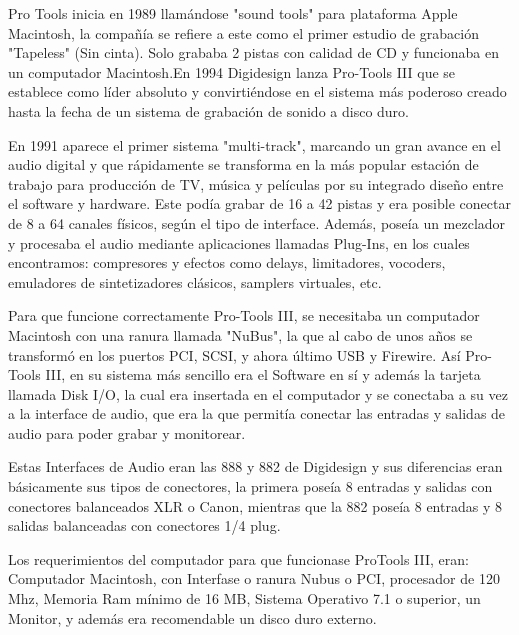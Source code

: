 Pro Tools inicia en 1989 llamándose "sound tools" para
plataforma Apple Macintosh, la compañía se refiere a este como
el primer estudio de grabación "Tapeless" (Sin cinta). Solo
grababa 2 pistas con calidad de CD y funcionaba en un
computador Macintosh.En 1994 Digidesign lanza Pro-Tools III
que se establece como líder absoluto y convirtiéndose en el
sistema más poderoso creado hasta la fecha de un sistema de
grabación de sonido a disco duro.

En 1991 aparece el primer sistema "multi-track", marcando un
gran avance en el audio digital y que rápidamente se transforma
en la más popular estación de trabajo para producción de TV,
música y películas por su integrado diseño entre el software y
hardware. Este podía grabar de 16 a 42 pistas y era posible
conectar de 8 a 64 canales físicos, según el tipo de interface.
Además, poseía un mezclador y procesaba el audio mediante
aplicaciones llamadas Plug-Ins, en los cuales encontramos:
compresores y efectos como delays, limitadores, vocoders,
emuladores de sintetizadores clásicos, samplers virtuales, etc.

Para que funcione correctamente Pro-Tools III, se necesitaba un
computador Macintosh con una ranura llamada "NuBus", la que
al cabo de unos años se transformó en los puertos PCI, SCSI, y
ahora último USB y Firewire. Así Pro-Tools III, en su sistema
más sencillo era el Software en sí y además la tarjeta llamada
Disk I/O, la cual era insertada en el computador y se conectaba a
su vez a la interface de audio, que era la que permitía conectar
las entradas y salidas de audio para poder grabar y monitorear.

Estas Interfaces de Audio eran las 888 y 882 de Digidesign y sus
diferencias eran básicamente sus tipos de conectores, la primera
poseía 8 entradas y salidas con conectores balanceados XLR o
Canon, mientras que la 882 poseía 8 entradas y 8 salidas
balanceadas con conectores 1/4 plug.

Los requerimientos del computador para que funcionase ProTools
III, eran: Computador Macintosh, con Interfase o ranura
Nubus o PCI, procesador de 120 Mhz, Memoria Ram mínimo de
16 MB, Sistema Operativo 7.1 o superior, un Monitor, y además
era recomendable un disco duro externo.



